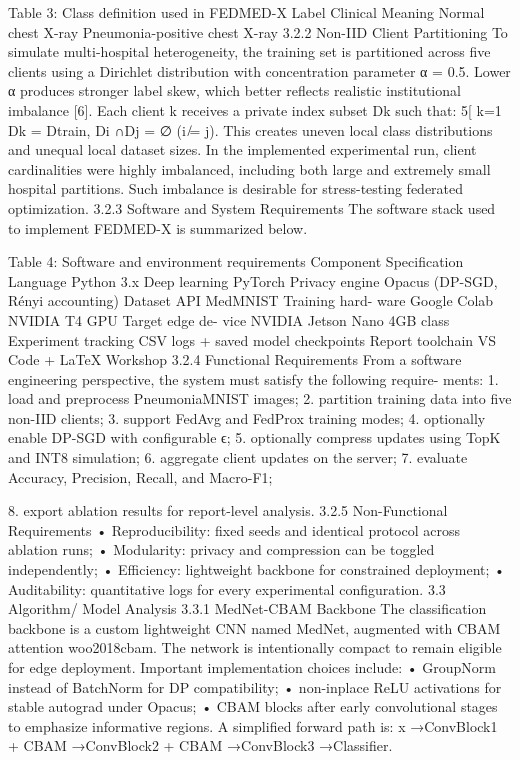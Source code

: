 Table 3: Class definition used in FEDMED-X
Label
Clinical Meaning
Normal chest X-ray
Pneumonia-positive chest X-ray 3.2.2
Non-IID Client Partitioning
To simulate multi-hospital heterogeneity, the training set is partitioned across five clients using a Dirichlet distribution with concentration parameter α = 0.5. Lower α produces stronger label skew, which better reflects realistic institutional imbalance [6].
Each client k receives a private index subset Dk such that:
5[ k=1
Dk = Dtrain,
Di ∩Dj = ∅ (i ̸= j).
This creates uneven local class distributions and unequal local dataset sizes. In the implemented experimental run, client cardinalities were highly imbalanced, including both large and extremely small hospital partitions. Such imbalance is desirable for stress-testing federated optimization.
3.2.3
Software and System Requirements
The software stack used to implement FEDMED-X is summarized below.

Table 4: Software and environment requirements
Component
Specification
Language
Python 3.x
Deep learning
PyTorch
Privacy engine
Opacus (DP-SGD, Rényi accounting)
Dataset API
MedMNIST
Training hard- ware
Google Colab NVIDIA T4 GPU
Target edge de- vice
NVIDIA Jetson Nano 4GB class
Experiment tracking
CSV logs + saved model checkpoints
Report toolchain
VS Code + LaTeX Workshop 3.2.4
Functional Requirements
From a software engineering perspective, the system must satisfy the following require- ments:
1. load and preprocess PneumoniaMNIST images; 2. partition training data into five non-IID clients; 3. support FedAvg and FedProx training modes; 4. optionally enable DP-SGD with configurable ϵ; 5. optionally compress updates using TopK and INT8 simulation; 6. aggregate client updates on the server; 7. evaluate Accuracy, Precision, Recall, and Macro-F1;

8. export ablation results for report-level analysis.
3.2.5
Non-Functional Requirements
• Reproducibility: fixed seeds and identical protocol across ablation runs;
• Modularity: privacy and compression can be toggled independently;
• Efficiency: lightweight backbone for constrained deployment;
• Auditability: quantitative logs for every experimental configuration.
3.3
Algorithm/ Model Analysis 3.3.1
MedNet-CBAM Backbone
The classification backbone is a custom lightweight CNN named MedNet, augmented with CBAM attention woo2018cbam. The network is intentionally compact to remain eligible for edge deployment. Important implementation choices include:
• GroupNorm instead of BatchNorm for DP compatibility;
• non-inplace ReLU activations for stable autograd under Opacus;
• CBAM blocks after early convolutional stages to emphasize informative regions.
A simplified forward path is:
x →ConvBlock1 + CBAM →ConvBlock2 + CBAM →ConvBlock3 →Classifier.

